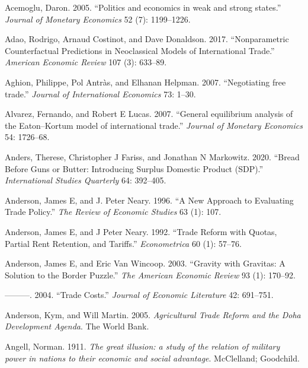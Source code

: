\documentclass{puthesis}
\newlength{\cslhangindent}
\newenvironment{cslreferences}%
  {\setlength{\parindent}{0pt}%
  \everypar{\setlength{\hangindent}{\cslhangindent}}\ignorespaces}%
  {\par}
\begin{document}
\hypertarget{refs}{}
\begin{cslreferences}
\leavevmode\hypertarget{ref-Acemoglu2005b}{}%
Acemoglu, Daron. 2005. ``Politics and economics in weak and strong
states.'' \emph{Journal of Monetary Economics} 52 (7): 1199--1226.

\leavevmode\hypertarget{ref-Adao2017}{}%
Adao, Rodrigo, Arnaud Costinot, and Dave Donaldson. 2017.
``Nonparametric Counterfactual Predictions in Neoclassical Models of
International Trade.'' \emph{American Economic Review} 107 (3): 633--89.

\leavevmode\hypertarget{ref-Aghion2007}{}%
Aghion, Philippe, Pol Antràs, and Elhanan Helpman. 2007. ``Negotiating
free trade.'' \emph{Journal of International Economics} 73: 1--30.

\leavevmode\hypertarget{ref-Alvarez2007}{}%
Alvarez, Fernando, and Robert E Lucas. 2007. ``General equilibrium
analysis of the Eaton--Kortum model of international trade.''
\emph{Journal of Monetary Economics} 54: 1726--68.

\leavevmode\hypertarget{ref-Markowitz2020}{}%
Anders, Therese, Christopher J Fariss, and Jonathan N Markowitz. 2020.
``Bread Before Guns or Butter: Introducing Surplus Domestic Product
(SDP).'' \emph{International Studies Quarterly} 64: 392--405.

\leavevmode\hypertarget{ref-Anderson1996}{}%
Anderson, James E, and J. Peter Neary. 1996. ``A New Approach to
Evaluating Trade Policy.'' \emph{The Review of Economic Studies} 63 (1):
107.

\leavevmode\hypertarget{ref-Anderson1992}{}%
Anderson, James E, and J Peter Neary. 1992. ``Trade Reform with Quotas,
Partial Rent Retention, and Tariffs.'' \emph{Econometrica} 60 (1):
57--76.

\leavevmode\hypertarget{ref-Anderson2003}{}%
Anderson, James E, and Eric Van Wincoop. 2003. ``Gravity with Gravitas:
A Solution to the Border Puzzle.'' \emph{The American Economic Review}
93 (1): 170--92.

\leavevmode\hypertarget{ref-Anderson2004}{}%
---------. 2004. ``Trade Costs.'' \emph{Journal of Economic Literature}
42: 691--751.

\leavevmode\hypertarget{ref-Anderson2005}{}%
Anderson, Kym, and Will Martin. 2005. \emph{Agricultural Trade Reform
and the Doha Development Agenda}. The World Bank.

\leavevmode\hypertarget{ref-Angell1911}{}%
Angell, Norman. 1911. \emph{The great illusion: a study of the relation
of military power in nations to their economic and social advantage}.
McClelland; Goodchild.


\end{cslreferences}
\end{document}
